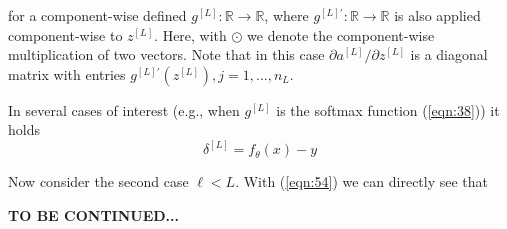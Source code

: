 for a component-wise defined $g^{[L]}: \mathbb{R} \rightarrow \mathbb{R}$, where $g^{[L]'}: \mathbb{R} \rightarrow \mathbb{R}$ is also applied component-wise to $z^{[L]}$. Here, with $\odot$ we denote the component-wise multiplication of two vectors. Note that in this case $\partial a^{[L]} / \partial z^{[L]}$ is a diagonal matrix with entries $g^{[L]'} \left( z^{[L]} \right), j= 1, \ldots, n_L$.

\begin{remark}
In several cases of interest (e.g., when $g^{[L]}$ is the softmax function (\ref{eqn:38})) it holds
\begin{equation}
    \delta^{[L]} = f_\theta(x) - y
    \label{eqn:61}
\end{equation}
\end{remark}
\vspace{2em}
Now consider the second case $\ell < L$. With (\ref{eqn:54}) we can directly see that

\vspace{5em}
\textbf{TO BE CONTINUED...}


